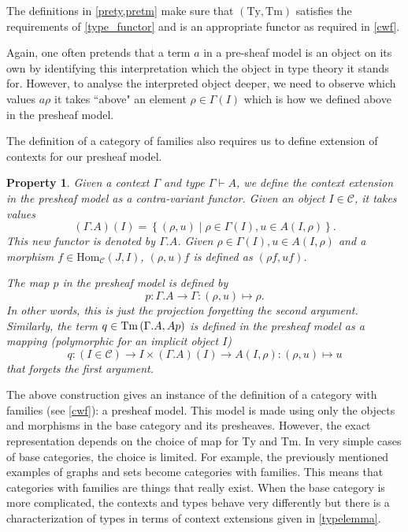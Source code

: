 \documentclass[12pt,a4paper,twoside,xetex,draft]{book}
\newtheorem{property}[theorem]{Property}
\begin{document}
The definitions in \cref{prety,pretm} make sure that $(\text{Ty},\text{Tm})$  satisfies the requirements of \cref{type_functor} and is an appropriate functor as required in \cref{cwf}.


Again, one often pretends that a term $a$ in a pre-sheaf model is an object on its own by identifying this interpretation which the object in type theory it stands for. However, to analyse the interpreted object deeper,  we need to observe which values $a\rho$ it takes ``above" an element $\rho \in \Gamma (I)$ which is how we defined above in the presheaf model.

The definition of a category of families also requires us to define extension of contexts for our presheaf model. 

\begin{property}\label{preext}
Given a context $\Gamma$ and type $\Gamma \vdash A$, we define the context extension in the presheaf model as a contra-variant functor. Given an object $I \in \mathcal{C}$, it takes values $$(\Gamma . A)(I) = \left\{ (\rho , u) \mid \rho \in \Gamma (I) , u \in A (I, \rho ) \right\}.$$ This new functor is denoted by $\Gamma . A$. Given $\rho \in \Gamma (I), u \in A(I,\rho )$ and a morphism $f \in \text{Hom}_{\mathcal{C}}(J,I)$, $(\rho, u)f$ is defined as $(\rho f, uf)$. 


The map $p$ in the presheaf model is defined by $$p: \Gamma . A \rightarrow \Gamma : (\rho , u ) \mapsto \rho.$$ In other words, this is just the projection forgetting the second argument. Similarly, the term $q \in \text{Tm}\left(\Gamma . A,Ap\right) $ is defined in the presheaf model  as a mapping (polymorphic for an implicit object $I$) $$q: (I \in \mathcal{C}) \rightarrow I \times (\Gamma . A)(I) \rightarrow A(I,\rho): (\rho, u) \mapsto u$$ that forgets the first argument.
\end{property}

The above construction gives an instance of the definition of a category with families (see \cref{cwf}): a presheaf model. This model is made using only the objects and morphisms in the base category and its presheaves. However, the exact representation depends on the choice of map for $\text{Ty}$ and $\text{Tm}$. In very simple cases of base categories, the choice is limited. For example, the previously mentioned examples of graphs and sets become categories with families. This means that categories with families are things that really exist. When the base category is more complicated, the contexts and types behave very differently but there is a characterization of types in terms of context extensions given in \cref{typelemma}.
\end{document}
